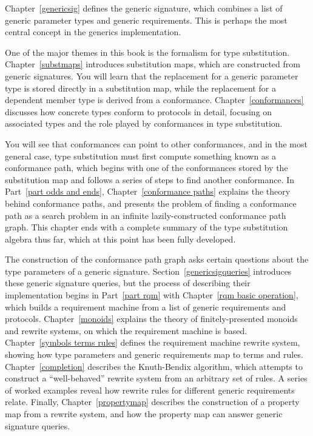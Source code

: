 \documentclass[../generics]{subfiles}
\begin{document}
Chapter~\ref{genericsig} defines the generic signature, which combines a list of generic parameter types and generic requirements. This is perhaps the most central concept in the generics implementation.

One of the major themes in this book is the formalism for type substitution. Chapter~\ref{substmaps} introduces substitution maps, which are constructed from generic signatures. You will learn that the replacement for a generic parameter type is stored directly in a substitution map, while the replacement for a dependent member type is derived from a conformance. Chapter~\ref{conformances} discusses how concrete types conform to protocols in detail, focusing on associated types and the role played by conformances in type substitution.

You will see that conformances can point to other conformances, and in the most general case, type substitution must first compute something known as a conformance path, which begins with one of the conformances stored by the substitution map and follows a series of steps to find another conformance. In Part~\ref{part odds and ends}, Chapter~\ref{conformance paths} explains the theory behind conformance paths, and presents the problem of finding a conformance path as a search problem in an infinite lazily-constructed conformance path graph. This chapter ends with a complete summary of the type substitution algebra thus far, which at this point has been fully developed.

The construction of the conformance path graph asks certain questions about the type parameters of a generic signature. Section~\ref{genericsigqueries} introduces these generic signature queries, but the process of describing their implementation begins in Part~\ref{part rqm} with Chapter~\ref{rqm basic operation}, which builds a requirement machine from a list of generic requirements and protocols. Chapter~\ref{monoids} explains the theory of finitely-presented monoids and rewrite systems, on which the requirement machine is based. Chapter~\ref{symbols terms rules} defines the requirement machine rewrite system, showing how type parameters and generic requirements map to terms and rules. Chapter~\ref{completion} describes the Knuth-Bendix algorithm, which attempts to construct a ``well-behaved'' rewrite system from an arbitrary set of rules. A series of worked examples reveal how rewrite rules for different generic requirements relate. Finally, Chapter~\ref{propertymap} describes the construction of a property map from a rewrite system, and how the property map can answer generic signature queries.
\end{document}
